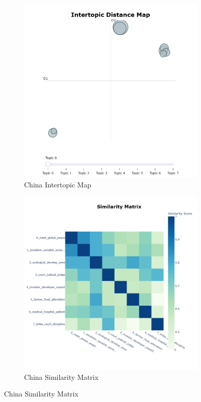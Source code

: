 \documentclass{article}
\theoremstyle{mytheoremstyle}
\theoremstyle{mytheoremstyle}
\theoremstyle{myproblemstyle}
\begin{document}
\begin{figure}[hp]
        \begin{subfigure}{0.45\textwidth}
            \includegraphics[width=\textwidth]{intertopic_distance_map_china.png}
            \caption{China Intertopic Map}
            \label{fig:intertopic_china}
        \end{subfigure}
        \hfill
        \begin{subfigure}{0.45\textwidth}
            \includegraphics[width=\textwidth]{similarity_matrix_china.png}
            \caption{China Similarity Matrix}
            \label{fig:sim_china}
        \end{subfigure}
        \hfill


\end{figure}
\end{document}

